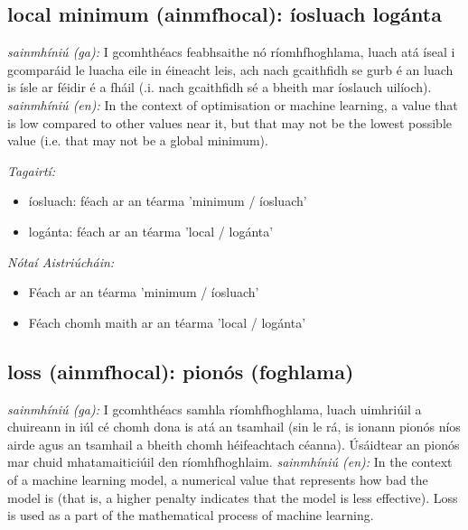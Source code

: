 \documentclass{article}
\begin{document}
\subsection*{local minimum (ainmfhocal): íosluach logánta} 
 \noindent \textit{sainmhíniú (ga):} I gcomhthéacs feabhsaithe nó ríomhfhoghlama, luach atá íseal i gcomparáid le luacha eile in éineacht leis, ach nach gcaithfidh se gurb é an luach is ísle ar féidir é a fháil (.i. nach gcaithfidh sé a bheith mar íoslauch uilíoch).
\newline\newline
 \noindent \textit{sainmhíniú (en):} In the context of optimisation or machine learning, a value that is low compared to other values near it, but that may not be the lowest possible value (i.e. that may not be a global minimum).
\newline

 \noindent \textit{Tagairtí:}
\begin{itemize}
	\item íosluach: féach ar an téarma 'minimum / íosluach'
	\item logánta: féach ar an téarma 'local / logánta'
\end{itemize}

 \noindent \textit{Nótaí Aistriúcháin:}
\begin{itemize}
	\item Féach ar an téarma 'minimum / íosluach'
	\item Féach chomh maith ar an téarma 'local / logánta'
\end{itemize}


\subsection*{loss (ainmfhocal): pionós (foghlama)} 
 \noindent \textit{sainmhíniú (ga):} I gcomhthéacs samhla ríomhfhoghlama, luach uimhriúil a chuireann in iúl cé chomh dona is atá an tsamhail (sin le rá, is ionann pionós níos airde agus an tsamhail a bheith chomh héifeachtach céanna). Úsáidtear an pionós mar chuid mhatamaiticiúil den ríomhfhoghlaim.
\newline\newline
 \noindent \textit{sainmhíniú (en):} In the context of a machine learning model, a numerical value that represents how bad the model is (that is, a higher penalty indicates that the model is less effective). Loss is used as a part of the mathematical process of machine learning.
\newline
\end{document}
